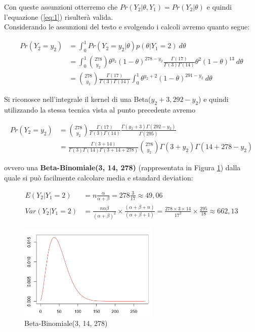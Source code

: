 Con queste assunzioni otterremo che $Pr(Y_2|\theta,Y_1) = Pr(Y_2|\theta)$ e quindi l'equazione (\ref{eq:1}) risulterà valida. \\
Considerando le assunzioni del testo e svolgendo i calcoli avremo quanto segue:

\begin{align*}
     Pr(Y_2=y_2) &= \int_0^1 Pr(Y_2=y_2|\theta)p(\theta|Y_1=2) \ d\theta\\
     &= \int_0^1 \binom{278}{y_2}\theta^{y_2}(1-\theta)^{278-y_2} \frac{\Gamma(17)}{\Gamma(3)\Gamma(14)} \theta^2(1-\theta)^{13}\ d\theta\\
      &= \binom{278}{y_2} \frac{\Gamma(17)}{\Gamma(3)\Gamma(14)} \int_0^1 \theta^{y_2 + 2}(1-\theta)^{291-y_2}\ d\theta
\end{align*}

Si riconosce nell'integrale il kernel di una Beta($y_2+3,292-y_2$) e quindi utilizzando 
la stessa tecnica vista al punto precedente avremo

\begin{align*}
     Pr(Y_2=y_2) &= \binom{278}{y_2} \frac{\Gamma(17)}{\Gamma(3)\Gamma(14)} \frac{\Gamma(y_2+3)\Gamma(292-y_2)}{\Gamma(295)}\\
     &=  \frac{\Gamma(3+14)}{\Gamma(3)\Gamma(14)\Gamma(3+14+278)}\binom{278}{y_2} \Gamma(3+y_2)\Gamma(14+278-y_2)
\end{align*}

ovvero una \textbf{Beta-Binomiale(3, 14, 278)} 
(rappresentata in Figura \ref{fig:betaBinomiale}) dalla quale si può 
facilmente calcolare media e standard deviation:

\begin{align*}
    E(Y_2|Y_1=2) &= n\frac{\alpha}{\alpha + \beta} = 278\frac{3}{17} \approx 49,06\\
    Var(Y_2|Y_1=2) &= \frac{n\alpha\beta}{(\alpha + \beta)^2}\times\frac{(\alpha + \beta + n)}{(\alpha + \beta + 1)} = \frac{278\times3\times14}{17^2} \times\frac{295}{18} \approx 662,13
\end{align*}


\begin{figure}[!ht]
\centering
\includegraphics[width=0.6\textwidth]{img/esercizio3-07-BetaBinomiale}
\caption{Beta-Binomiale(3, 14, 278)}
\label{fig:betaBinomiale}
\end{figure}

